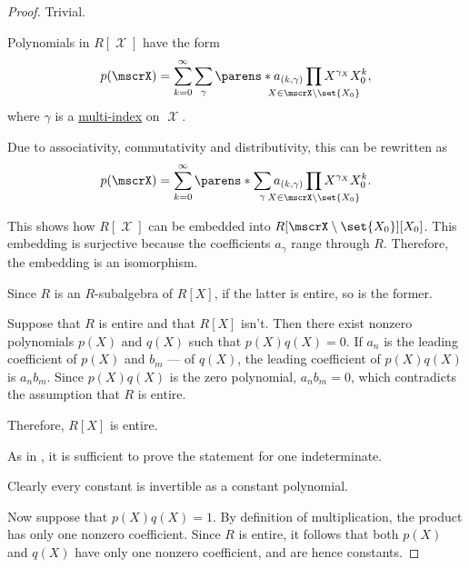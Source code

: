 \begin{proof}
   Trivial.

   Polynomials in \( R[\mscrX] \) have the form
  \begin{equation*}
    p(\mscrX) = \sum_{k=0}^\infty \sum_\gamma \parens*{ a_{(k,\gamma)} \prod_{\mathclap{X \in \mscrX \setminus \set{ X_0 }}} X^{\gamma_X} } X_0^k,
  \end{equation*}
  where \( \gamma \) is a \hyperref[def:multi_index]{multi-index} on \( \mscrX \).

  Due to associativity, commutativity and distributivity, this can be rewritten as
  \begin{equation*}
    p(\mscrX) = \sum_{k=0}^\infty \parens*{ \sum_\gamma a_{(k,\gamma)} \prod_{\mathclap{X \in \mscrX \setminus \set{ X_0 }}} X^{\gamma_X} } X_0^k.
  \end{equation*}

  This shows how \( R[\mscrX] \) can be embedded into \( R[\mscrX \setminus \set{ X_0 }][X_0] \). This embedding is surjective because the coefficients \( a_\gamma \) range through \( R \). Therefore, the embedding is an isomorphism.


  \SufficiencySubProof Since \( R \) is an \( R \)-subalgebra of \( R[X] \), if the latter is entire, so is the former.

  \NecessitySubProof Suppose that \( R \) is entire and that \( R[X] \) isn't. Then there exist nonzero polynomials \( p(X) \) and \( q(X) \) such that \( p(X) q(X) = 0 \). If \( a_n \) is the leading coefficient of \( p(X) \) and \( b_m \) --- of \( q(X) \), the leading coefficient of \( p(X) q(X) \) is \( a_n b_m \). Since \( p(X) q(X) \) is the zero polynomial, \( a_n b_m = 0 \), which contradicts the assumption that \( R \) is entire.

  Therefore, \( R[X] \) is entire.

   As in , it is sufficient to prove the statement for one indeterminate.

  Clearly every constant is invertible as a constant polynomial.

  Now suppose that \( p(X) q(X) = 1 \). By definition of multiplication, the product has only one nonzero coefficient. Since \( R \) is entire, it follows that both \( p(X) \) and \( q(X) \) have only one nonzero coefficient, and are hence constants.
\end{proof}

